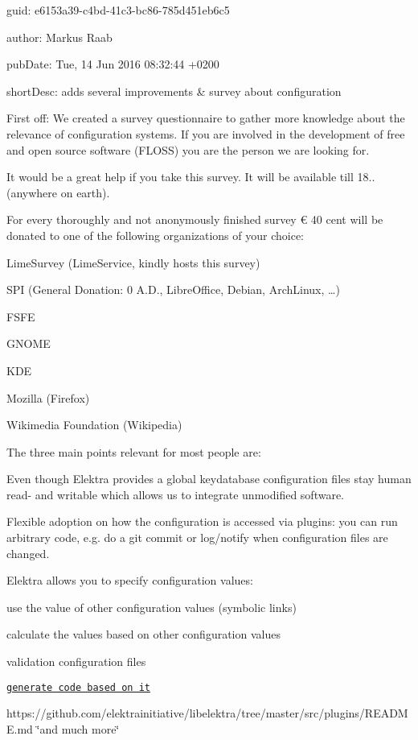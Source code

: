 
\begin{DoxyItemize}
\item guid\+: e6153a39-\/c4bd-\/41c3-\/bc86-\/785d451eb6c5
\item author\+: Markus Raab
\item pub\+Date\+: Tue, 14 Jun 2016 08\+:32\+:44 +0200
\item short\+Desc\+: adds several improvements \& survey about configuration
\end{DoxyItemize}

First off\+: We created a survey questionnaire to gather more knowledge about the relevance of configuration systems. If you are involved in the development of free and open source software (F\+L\+O\+SS) you are the person we are looking for.

It would be a great help if you take this survey. It will be available till 18.. (anywhere on earth).

For every thoroughly and not anonymously finished survey € 40 cent will be donated to one of the following organizations of your choice\+:


\begin{DoxyItemize}
\item Lime\+Survey (Lime\+Service, kindly hosts this survey)
\item S\+PI (General Donation\+: 0 A.\+D., Libre\+Office, Debian, Arch\+Linux, …)
\item F\+S\+FE
\item G\+N\+O\+ME
\item K\+DE
\item Mozilla (Firefox)
\item Wikimedia Foundation (Wikipedia)
\end{DoxyItemize}

The three main points relevant for most people are\+:


\begin{DoxyEnumerate}
\item Even though Elektra provides a global keydatabase configuration files stay human read-\/ and writable which allows us to integrate unmodified software.
\item Flexible adoption on how the configuration is accessed via plugins\+: you can run arbitrary code, e.\+g. do a {\ttfamily git commit} or log/notify when configuration files are changed.
\item Elektra allows you to specify configuration values\+:
\begin{DoxyItemize}
\item use the value of other configuration values (symbolic links)
\item calculate the values based on other configuration values
\item validation configuration files
\item \href{https://master.libelektra.org/src/tools/pythongen}{\tt generate code based on it}
\item https\+://github.com/elektrainitiative/libelektra/tree/master/src/plugins/\+R\+E\+A\+D\+M\+E.\+md \char`\"{}and much more\char`\"{}
\end{DoxyItemize}
\end{DoxyEnumerate}

